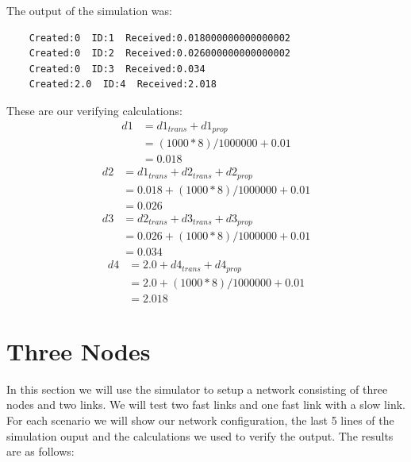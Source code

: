 \documentclass[fleqn,11pt]{article}
\begin{document}
\begin{enumerate}
  The output of the simulation was:
  \begin{lstlisting}
    Created:0  ID:1  Received:0.018000000000000002
    Created:0  ID:2  Received:0.026000000000000002
    Created:0  ID:3  Received:0.034
    Created:2.0  ID:4  Received:2.018
  \end{lstlisting}
  These are our verifying calculations:
  \begin{align*}
    d1 &= d1_{trans} + d1_{prop}\\
      &= (1000*8)/1000000 + 0.01\\
      &= 0.018
  \end{align*}
  \begin{align*}
    d2 &= d1_{trans} + d2_{trans} + d2_{prop} \\
      &= 0.018 + (1000*8)/1000000 + 0.01\\
      &= 0.026
  \end{align*}
  \begin{align*}
    d3 &= d2_{trans} + d3_{trans} + d3_{prop}\\
      &= 0.026 + (1000*8)/1000000 + 0.01\\
      &= 0.034
  \end{align*}
  \begin{align*}
    d4 &= 2.0 + d4_{trans} + d4_{prop}\\
      &= 2.0 + (1000*8)/1000000 + 0.01\\
      &= 2.018
  \end{align*}
  
\end{enumerate}

\section{Three Nodes}

In this section we will use the simulator to setup a network consisting of three nodes and two links. We will test two fast links and one fast link with a slow link. For each scenario we will show our network configuration, the last 5 lines of the simulation ouput and the calculations we used to verify the output.
The results are as follows:  
\end{document}
